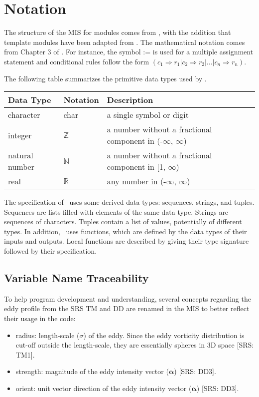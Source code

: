 \documentclass[12pt, titlepage]{article}
\begin{document}
\section{Notation}


The structure of the MIS for modules comes from \citet{HoffmanAndStrooper1995},
with the addition that template modules have been adapted from
\cite{GhezziEtAl2003}.  The mathematical notation comes from Chapter 3 of
\citet{HoffmanAndStrooper1995}.  For instance, the symbol := is used for a
multiple assignment statement and conditional rules follow the form $(c_1
\Rightarrow r_1 | c_2 \Rightarrow r_2 | ... | c_n \Rightarrow r_n )$.

The following table summarizes the primitive data types used by \progname. 

\begin{center}
\renewcommand{\arraystretch}{1.2}
\noindent 
\begin{tabular}{l l p{7.5cm}} 
\toprule 
\textbf{Data Type} & \textbf{Notation} & \textbf{Description}\\ 
\midrule
character & char & a single symbol or digit\\
integer & $\mathbb{Z}$ & a number without a fractional component in (-$\infty$, $\infty$) \\
natural number & $\mathbb{N}$ & a number without a fractional component in [1, $\infty$) \\
real & $\mathbb{R}$ & any number in (-$\infty$, $\infty$)\\
\bottomrule
\end{tabular} 
\end{center}

\noindent
The specification of \progname \ uses some derived data types: sequences, strings, and
tuples. Sequences are lists filled with elements of the same data type. Strings
are sequences of characters. Tuples contain a list of values, potentially of
different types. In addition, \progname \ uses functions, which
are defined by the data types of their inputs and outputs. Local functions are
described by giving their type signature followed by their specification.

\subsection{Variable Name Traceability}
To help program development and understanding, several concepts regarding the eddy profile from the SRS TM and DD are renamed in the MIS to better reflect their usage in the code:
\begin{itemize}
  \item radius: length-scale ($\sigma$) of the eddy. Since the eddy vorticity distribution is cut-off outside the length-scale, they are essentially spheres in 3D space [SRS: TM1].
  \item strength: magnitude of the eddy intensity vector ($\boldsymbol{\alpha}$) [SRS: DD3].
  \item orient: unit vector direction of the eddy intensity vector ($\boldsymbol{\alpha}$) [SRS: DD3].
\end{itemize}
\end{document}
